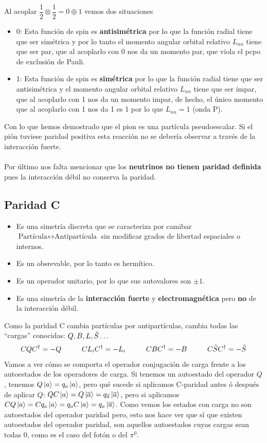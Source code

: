 \clearpage
Al acoplar $\dfrac{1}{2} \otimes \dfrac{1}{2}=0\oplus 1$ vemos dos situaciones \label{sec: estado ligado de dos neutrones}
\begin{itemize}
    \item 0: Esta función de spin es \textbf{antisimétrica} por lo que la función radial tiene que ser simétrica y por lo tanto el momento angular orbital relativo $L_{nn}$ tiene que ser par, que al acoplarlo con 0 nos da un momento par, que viola el pcpo de exclusión de Pauli.
    \item 1: Esta función de spin es \textbf{simétrica} por lo que la función radial tiene que ser antisimétrica y el momento angular orbital relativo $L_{nn}$ tiene que ser impar, que al acoplarlo con 1 nos da un momento impar, de hecho, el único momento que al acoplarlo con 1 nos da 1 es 1 por lo que $L_{nn}=1$ (onda P).
\end{itemize}
Con lo que hemos demostrado que el pion es una partícula pseudoescalar. Si el pión tuviese paridad positiva esta reacción no se debería observar a través de la interacción fuerte.\\\\
Por último nos falta mencionar que los \textbf{neutrinos no tienen paridad definida} pues la interacción débil no conserva la paridad.
\subsection{Paridad C}
\begin{itemize}
    \item Es una simetría discreta que se caracteriza por camibar $\text{Partícula} \longleftrightarrow \text{Antipartícula}$ sin modificar grados de libertad espaciales o internos. 
    \item Es un obsrevable, por lo tanto es hermítico.
    \item Es un operador unitario, por lo que sus autovalores son $\pm 1$.
    \item Es una simetría de la \textbf{interacción fuerte} y \textbf{electromagnética} pero \textbf{no} de la interacción débil.
\end{itemize}
Como la paridad C cambia partículas por antipartículas, cambia todas las ``cargas'' conocidas: $Q,B,L,\Tilde{S}\dots$ 
\begin{equation}
    C QC^\dagger=-Q \hspace{1cm}
       C L_iC^\dagger=-L_i \hspace{1cm}
       C BC^\dagger=-B \hspace{1cm} C\Tilde{S}C^\dagger=-\Tilde{S}
\end{equation}
Vamos a ver cómo se comporta el operador conjugación de carga frente a los autoestados de los operadores de carga. Si tenemos un autoestado del operador $Q$, tenemos $Q\ket{a}=q_a\ket{a}$, pero qué sucede si aplicamos C-paridad antes ó después de aplicar $Q$:
$QC\ket{a}=Q\ket{\overline{a}}=q_{\overline{a}}\ket{\overline{a}}$, pero si aplicamos $CQ\ket{a}=C q_a\ket{a}=q_aC\ket{a}=q_{a}\ket{\overline{a}}$. Como vemos los estados con carga no son autoestados del operador paridad pero, esto nos hace ver que sí que existen autoestados del operador paridad, son aquellos autoestados cuyas cargas sean todas 0, como es el caso del fotón o del $\pi^0$.
